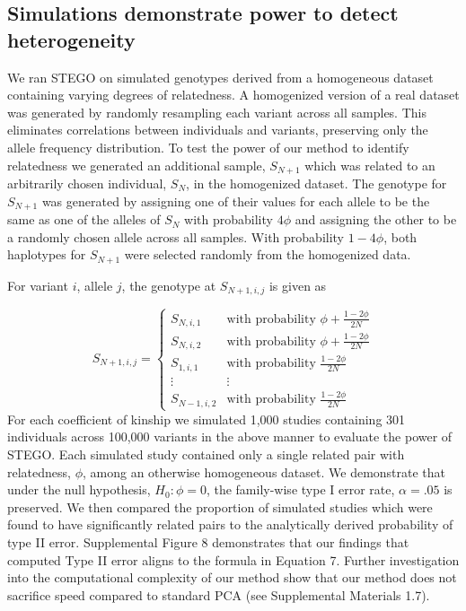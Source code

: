 \subsection{Simulations demonstrate power to detect heterogeneity}

We ran STEGO on simulated genotypes derived from a homogeneous dataset
containing varying degrees of relatedness. A homogenized version of
a real dataset was generated by randomly resampling each variant across
all samples. This eliminates correlations between individuals and
variants, preserving only the allele frequency distribution. To test
the power of our method to identify relatedness we generated an additional
sample, $S_{N+1}$ which was related to an arbitrarily chosen individual,
$S_{N}$, in the homogenized dataset. The genotype for $S_{N+1}$
was generated by assigning one of their values for each allele to
be the same as one of the alleles of $S_{N}$ with probability $4\phi$
and assigning the other to be a randomly chosen allele across all
samples. With probability $1-4\phi$, both haplotypes for $S_{N+1}$
were selected randomly from the homogenized data.

For variant $i$, allele $j$, the genotype at $S_{N+1,i,j}$ is given
as

\[ S_{N+1,i,j}=\begin{cases} S_{N,i,1} & \mbox{with probability }\phi+\frac{1-2\phi}{2N}\\ S_{N,i,2} & \mbox{with probability }\phi+\frac{1-2\phi}{2N}\\ S_{1,i,1} & \mbox{with probability }\frac{1-2\phi}{2N}\\ \vdots & \vdots\\ S_{N-1,i,2} & \mbox{with probability }\frac{1-2\phi}{2N} \end{cases} \] For
each coefficient of kinship we simulated 1,000 studies containing
301 individuals across 100,000 variants in the above manner to evaluate
the power of STEGO. Each simulated study contained only a single related
pair with relatedness, $\phi$, among an otherwise homogeneous dataset.
We demonstrate that under the null hypothesis, $H_{0}:\phi=0$, the
family-wise type I error rate, $\alpha=.05$ is preserved. We then
compared the proportion of simulated studies which were found to have
significantly related pairs to the analytically derived probability
of type II error. Supplemental Figure 8 demonstrates that our findings
that computed Type II error aligns to the formula in Equation 7. Further
investigation into the computational complexity of our method show
that our method does not sacrifice speed compared to standard PCA
(see Supplemental Materials 1.7).


